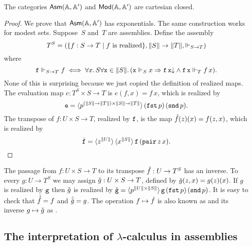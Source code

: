 \begin{proposition}
  \label{prop:asm-ccc}%
  The categories $\AsmA$ and $\ModA$ are cartesian closed.
\end{proposition}

\begin{proof}
  We prove that $\AsmA$ has exponentials. The same construction works
  for modest sets. Suppose~$S$ and~$T$ are assemblies.
  Define the assembly
  \begin{equation*}
    T^{S} =
    (\set{f : S \to T \such \text{$f$ is realized}},
     \T{S} \to \T{T}, {\rz[S \to T]})
  \end{equation*}
  where
  \begin{equation*}
    \R{f} \rz[S \to T] f
    \iff
    \all{x}{S}{
      \all{\R{x} \in \T{S}}
          (\R{x} \rz[S] x \lthen
          \defined{\R{f}\,\R{x}} \land
          \R{f}\,\R{x} \rz[T] f\,x)
      }.
  \end{equation*}
  None of this is surprising because we just copied the definition of
  realized maps. The evaluation map $e : T^{S} \times
  S \to T$ is $e(f, x) = f\,x$, which is realized by
  \begin{equation*}
    \R{e} = \tpcalam{p}{(\T{S} \to \T{T}) \times \T{S} \to
      \T{T}}{(\combFst\,p)\,(\combSnd\,p)}.
  \end{equation*}
  The transpose of $f : U \times S \to T$, realized
  by $\R{f}$, is the map $\curry{f}(z)(x) = f(z,x)$, which is realized
  by
  \begin{equation*}
    \curry{\R{f}} = \tpcalam{z}{\T{U}} \tpcalam{x}{\T{S}} \R{f}\,(\combPair\,z\,x).
    \qedhere
  \end{equation*}
\end{proof}

The passage from $f : U \times S \to T$ to its
transpose $\curry{f} : U \to T^{S}$ has an inverse.
To every $g : U \to T^{S}$ we may assign
$\uncurry{g} : U \times S \to T$, defined by
$\uncurry{g}(z,x) = g(z)(x)$. If $g$ is realized by $\R{g}$ then
$\uncurry{g}$ is realized by $\uncurry{\R{g}} = \tpcalam{p}{\T{U}
    \times \T{S}}{\R{g}\,(\combFst\,p)\,(\combSnd\,p)}$. It is easy to
check that $\uncurry{\curry{f}} = f$ and $\curry{\uncurry{g}} = g$.
The operation $f \mapsto \curry{f}$ is also known as 
and its inverse $g \mapsto \uncurry{g}$ as .

\subsection{The interpretation of $\lambda$-calculus in assemblies}
\label{sec:interpr-lambda-calc}

